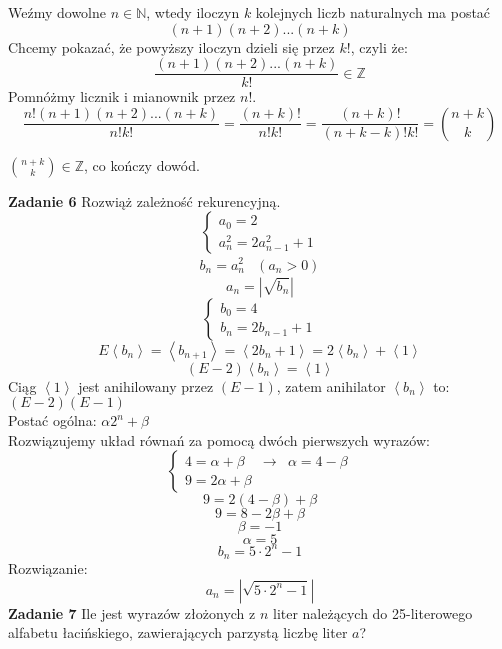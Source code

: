 \documentclass[12pt,a4paper]{article}
\begin{document}
Weźmy dowolne \( n \in \mathbb{N} \), wtedy iloczyn \(k\) kolejnych liczb naturalnych ma postać
\[
	(n + 1)(n + 2)...(n+k)
\]
Chcemy pokazać, że powyższy iloczyn dzieli się przez \( k! \), czyli że:
\[
	\frac{(n + 1)(n + 2)...(n+k)}{k!} \in \mathbb{Z}
\]
Pomnóżmy licznik i mianownik przez \( n! \).
\[
	\frac{n!(n + 1)(n + 2)...(n+k)}{n!k!} 
	= \frac{(n+k)!}{n!k!} = \frac{(n+k)!}{(n + k - k)!k!} 
	= \binom{n+k}{k}
\]

\( \binom{n+k}{k} \in \mathbb{Z} \), co kończy dowód.

\vskip 0.4cm
\noindent
\textbf{Zadanie 6} Rozwiąż zależność rekurencyjną.
\[
	\left\{ 
	\begin{array}{l}
		a_0 = 2 \\
		a_n^2 = 2a_{n-1}^2 + 1
	\end{array} 
	\right.
\]
\[
\begin{array}{cc}
	 b_n = a_n^2 & (a_n > 0)
\end{array}
\]
\[
 a_n = \left\lvert \sqrt{b_n} \right\rvert
\]
\[
	\left\{ 
	\begin{array}{l}
		b_0 = 4 \\
		b_n = 2b_{n-1} + 1
	\end{array} 
	\right.
\]
\[
	E \left< b_n \right> = \left< b_{n+1} \right> 
	= \left< 2b_n + 1 \right> 
	= 2\left< b_n \right> + \left< 1 \right>
\]
\[
	(E - 2) \left< b_n \right> = \left< 1 \right>
\]
Ciąg \( \left< 1 \right> \) jest anihilowany przez \( (E - 1) \), zatem anihilator \( \left< b_n \right> \) to: 
\( (E - 2)(E - 1)  \) \\
Postać ogólna: \( \alpha 2^n + \beta \) \\
Rozwiązujemy układ równań za pomocą dwóch pierwszych wyrazów:
\[
	\left\{ 
	\begin{array}{lll}
		4 = \alpha + \beta & \rightarrow & \alpha = 4 - \beta \\
		9 = 2\alpha + \beta
	\end{array} 
	\right.
\]
\[
	9 = 2(4 - \beta) + \beta
\]
\[
	9 = 8 - 2\beta + \beta
\]
\[
	\beta = -1
\]
\[
	\alpha = 5
\]
\[
	b_n = 5 \cdot 2^n - 1
\]
Rozwiązanie:
\[
	a_n = \left\lvert \sqrt{5 \cdot 2^n - 1} \right\rvert
\]
\newpage
\noindent
\textbf{Zadanie 7} Ile jest wyrazów złożonych z \(n\) liter należących do 25-literowego alfabetu łacińskiego, zawierających  parzystą liczbę liter \(a\)?
\end{document}
